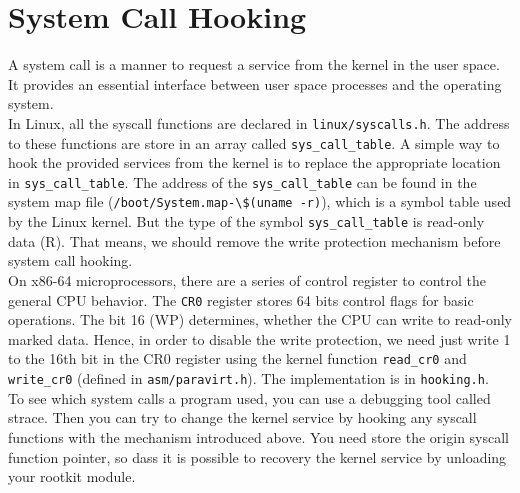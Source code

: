 \section{System Call Hooking}
\label{sec:syscallHooking}
A system call is a manner to request a service from the kernel in the user 
space. It provides an essential interface between user space processes and the 
operating system.\\
In Linux, all the syscall functions are declared in \verb+linux/syscalls.h+. The 
address to these functions are store in an array called \verb+sys_call_table+. 
A simple way to hook the provided services from the kernel is to replace the 
appropriate location in \verb+sys_call_table+. The address of the 
\verb+sys_call_table+ can be found in the system map file 
(\verb+/boot/System.map-\$(uname -r)+), which is a symbol table used by the 
Linux kernel. But the type of the symbol \verb+sys_call_table+ is read-only data 
(R). That means, we should remove the write protection mechanism before system 
call hooking.\\
On x86-64 microprocessors, there are a series of control register to control the 
general CPU behavior. The \texttt{CR0} register stores 64 bits control flags for 
basic operations. The bit 16 (WP) determines, whether the CPU can write to 
read-only marked data. Hence, in order to disable the write protection, we need 
just write 1 to the 16th bit in the CR0 register using the kernel function 
\verb+read_cr0+ and \verb+write_cr0+ (defined in \verb+asm/paravirt.h+). The 
implementation is in \texttt{hooking.h}.\\
To see which system calls a program used, you can use a debugging tool called 
strace. Then you can try to change the kernel service by hooking any syscall 
functions with the mechanism introduced above. You need store the origin syscall 
function pointer, so dass it is possible to recovery the kernel service by 
unloading your rootkit module. 

